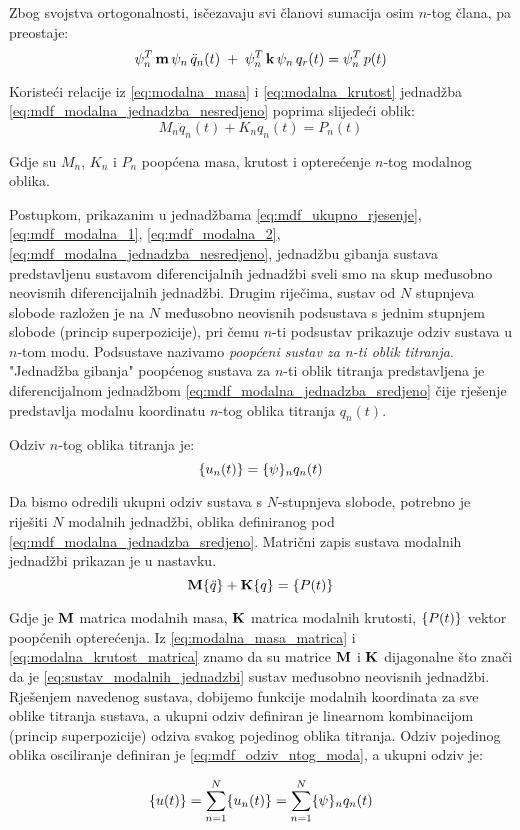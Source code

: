 Zbog svojstva ortogonalnosti, isčezavaju svi članovi sumacija osim $n$-tog člana, pa
preostaje:
\begin{equation}\label{eq:mdf_modalna_jednadzba_nesredjeno}
    \psi_n^T\,\mathbf{m}\,\psi_n\,\ddot{q}_n(t)\;+\;\psi_n^T\,\mathbf{k}\,\psi_n\,q_r(t)=\psi_n^T\,p(t)
\end{equation}

Koristeći relacije iz \eqref{eq:modalna_masa} i \eqref{eq:modalna_krutost} jednadžba
\eqref{eq:mdf_modalna_jednadzba_nesredjeno} poprima slijedeći oblik:
\begin{equation}\label{eq:mdf_modalna_jednadzba_sredjeno}
    M_n\ddot{q}_n(t)+K_nq_n(t)=P_n(t)
\end{equation}

Gdje su $M_n$, $K_n$ i $P_n$ poopćena masa, krutost i opterećenje $n$-tog modalnog
oblika.

Postupkom, prikazanim u jednadžbama \eqref{eq:mdf_ukupno_rjesenje},
\eqref{eq:mdf_modalna_1}, \eqref{eq:mdf_modalna_2},
\eqref{eq:mdf_modalna_jednadzba_nesredjeno}, jednadžbu gibanja sustava predstavljenu
sustavom diferencijalnih jednadžbi sveli smo na skup međusobno neovisnih
diferencijalnih jednadžbi. Drugim riječima, sustav od $N$ stupnjeva slobode razložen
je na $N$ međusobno neovisnih podsustava s jednim stupnjem slobode (princip superpozicije), 
pri čemu $n$-ti podsustav prikazuje odziv sustava u $n$-tom modu. Podsustave 
nazivamo \textit{poopćeni sustav za n-ti oblik titranja}. "Jednadžba gibanja" 
poopćenog sustava za $n$-ti oblik titranja predstavljena je diferencijalnom jednadžbom
\eqref{eq:mdf_modalna_jednadzba_sredjeno} čije rješenje predstavlja modalnu 
koordinatu $n$-tog oblika titranja $q_n(t)$.
\par

Odziv $n$-tog oblika titranja je:
\begin{equation}\label{eq:mdf_odziv_ntog_moda}
    \vtor{u_n(t)}{}=\vtor{\psi}{}_nq_n(t)
\end{equation}

Da bismo odredili ukupni odziv sustava s $N$-stupnjeva slobode, potrebno je riješiti
$N$ modalnih jednadžbi, oblika definiranog pod \eqref{eq:mdf_modalna_jednadzba_sredjeno}.
Matrični zapis sustava modalnih jednadžbi prikazan je u nastavku.
\begin{equation}\label{eq:sustav_modalnih_jednadzbi}
    \M\vtor{q}{:} + \K\vtor{q}{}=\vtor{P(t)}{}
\end{equation}

Gdje je $\mathbf{M}$ matrica modalnih masa, $\mathbf{K}$ matrica modalnih krutosti, $\vtor{P(t)}{}$
vektor poopćenih opterećenja. Iz \eqref{eq:modalna_masa_matrica} i
\eqref{eq:modalna_krutost_matrica} znamo da su matrice $\mathbf{M}$ i $\mathbf{K}$ dijagonalne što
znači da je \eqref{eq:sustav_modalnih_jednadzbi} sustav međusobno neovisnih jednadžbi.
Rješenjem navedenog sustava, dobijemo funkcije modalnih koordinata za sve 
oblike titranja sustava, a ukupni odziv definiran je linearnom kombinacijom 
(princip superpozicije) odziva svakog pojedinog oblika titranja. Odziv pojedinog oblika
osciliranje definiran je
\eqref{eq:mdf_odziv_ntog_moda}, a ukupni odziv je:

\begin{equation}\label{eq:mdf_modalna_ukupno_rjesenje}
    \vtor{u(t)}{}=\sum_{n=1}^N\vtor{u_n(t)}{}=\sum_{n=1}^N\vtor{\psi}{}_nq_n(t)
\end{equation}
